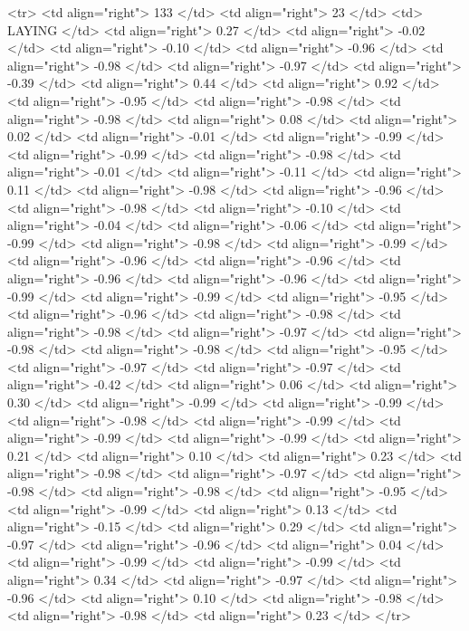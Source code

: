   <tr> <td align="right"> 133 </td> <td align="right">  23 </td> <td> LAYING </td> <td align="right"> 0.27 </td> <td align="right"> -0.02 </td> <td align="right"> -0.10 </td> <td align="right"> -0.96 </td> <td align="right"> -0.98 </td> <td align="right"> -0.97 </td> <td align="right"> -0.39 </td> <td align="right"> 0.44 </td> <td align="right"> 0.92 </td> <td align="right"> -0.95 </td> <td align="right"> -0.98 </td> <td align="right"> -0.98 </td> <td align="right"> 0.08 </td> <td align="right"> 0.02 </td> <td align="right"> -0.01 </td> <td align="right"> -0.99 </td> <td align="right"> -0.99 </td> <td align="right"> -0.98 </td> <td align="right"> -0.01 </td> <td align="right"> -0.11 </td> <td align="right"> 0.11 </td> <td align="right"> -0.98 </td> <td align="right"> -0.96 </td> <td align="right"> -0.98 </td> <td align="right"> -0.10 </td> <td align="right"> -0.04 </td> <td align="right"> -0.06 </td> <td align="right"> -0.99 </td> <td align="right"> -0.98 </td> <td align="right"> -0.99 </td> <td align="right"> -0.96 </td> <td align="right"> -0.96 </td> <td align="right"> -0.96 </td> <td align="right"> -0.96 </td> <td align="right"> -0.99 </td> <td align="right"> -0.99 </td> <td align="right"> -0.95 </td> <td align="right"> -0.96 </td> <td align="right"> -0.98 </td> <td align="right"> -0.98 </td> <td align="right"> -0.97 </td> <td align="right"> -0.98 </td> <td align="right"> -0.98 </td> <td align="right"> -0.95 </td> <td align="right"> -0.97 </td> <td align="right"> -0.97 </td> <td align="right"> -0.42 </td> <td align="right"> 0.06 </td> <td align="right"> 0.30 </td> <td align="right"> -0.99 </td> <td align="right"> -0.99 </td> <td align="right"> -0.98 </td> <td align="right"> -0.99 </td> <td align="right"> -0.99 </td> <td align="right"> -0.99 </td> <td align="right"> 0.21 </td> <td align="right"> 0.10 </td> <td align="right"> 0.23 </td> <td align="right"> -0.98 </td> <td align="right"> -0.97 </td> <td align="right"> -0.98 </td> <td align="right"> -0.98 </td> <td align="right"> -0.95 </td> <td align="right"> -0.99 </td> <td align="right"> 0.13 </td> <td align="right"> -0.15 </td> <td align="right"> 0.29 </td> <td align="right"> -0.97 </td> <td align="right"> -0.96 </td> <td align="right"> 0.04 </td> <td align="right"> -0.99 </td> <td align="right"> -0.99 </td> <td align="right"> 0.34 </td> <td align="right"> -0.97 </td> <td align="right"> -0.96 </td> <td align="right"> 0.10 </td> <td align="right"> -0.98 </td> <td align="right"> -0.98 </td> <td align="right"> 0.23 </td> </tr>
